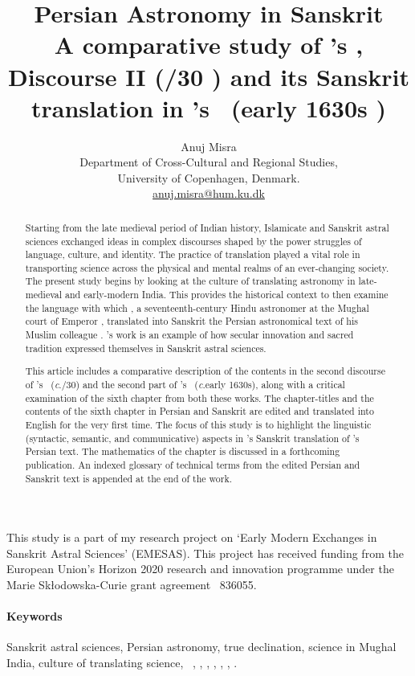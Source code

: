 \documentclass[10pt, a4paper, oneside]{memoir}
\title{Persian Astronomy in Sanskrit\\[5pt]
A comparative study of \MullaFarid's \ZijiShahJahani, Discourse II (\circa 1629/30 \ce) and its Sanskrit translation in \Nityananda's \Siddhantasindhu\ (\circa early 1630s \ce)}
\author{Anuj Misra\\[10pt] 

{\small Department of Cross-Cultural and Regional Studies,}\\{\small University of Copenhagen, Denmark.}\\{\small \url{anuj.misra@hum.ku.dk}}}
\date{}
\newcommand{\circa}{\emph{c}.\thinspace\nobreak }
\begin{document}
\sloppy
\sloppybottom
\maketitle
\thispagestyle{empty}
\vfill
This study is a part of my research project on `Early Modern Exchanges in Sanskrit Astral Sciences' (EMESAS). This project has received funding from the European Union’s Horizon 2020 research and innovation programme under the Marie Skłodowska-Curie grant agreement \textnumero\ 836055.
\clearpage


\thispagestyle{empty}

\begin{abstract}
Starting from the late medieval period of Indian history, Islamicate and Sanskrit astral sciences exchanged ideas in complex discourses shaped by the power struggles of language, culture, and identity. The practice of translation played a vital role in transporting science across the physical and mental realms of an ever-changing society. The present study begins by looking at the culture of translating astronomy in late-medieval and early-modern India. This provides the historical context to then examine the language with which \Nityananda, a seventeenth-century Hindu astronomer at the Mughal court of Emperor \Shahjahan, translated into Sanskrit the Persian astronomical text of his Muslim colleague \MullaFarid. \Nityananda's work is an example of how secular innovation and sacred tradition expressed themselves in Sanskrit astral sciences.

This article includes a comparative description of the contents in the second discourse of \MullaFarid's \ZijiShahJahani\ (\circa 1629/30) and the second part of \Nityananda's \Siddhantasindhu\ (\circa early 1630s), along with a critical examination of the sixth chapter from both these works. The chapter-titles and the contents of the sixth chapter in Persian and Sanskrit are edited and translated into English for the very first time. The focus of this study is to highlight the linguistic (syntactic, semantic, and communicative) aspects in \Nityananda's Sanskrit translation of \MullaFarid's Persian text. The mathematics of the chapter is discussed in a forthcoming publication. An indexed glossary of technical terms from the edited Persian and Sanskrit text is appended at the end of the work.
\end{abstract}
\vfill
 \paragraph{Keywords} Sanskrit astral sciences, Persian astronomy, true declination, science in Mughal India, culture of translating science, \ganita\ \jyotisa, \Nityananda, \MullaFarid, \Sarvasiddhantaraja, \Siddhantasindhu, \ZijiShahJahani, \ZijUlughBeg. 
\clearpage
\tableofcontents*
\clearpage
\end{document}
